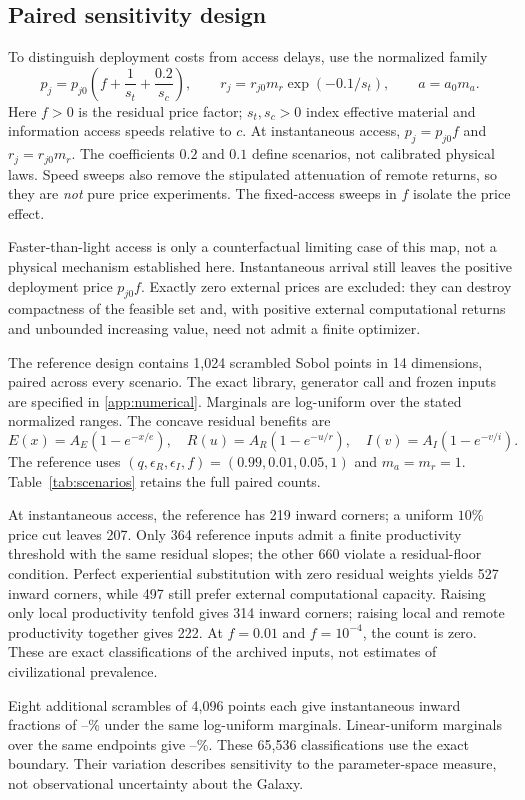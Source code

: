 \subsection{Paired sensitivity design}
To distinguish deployment costs from access delays, use the normalized
family
\begin{equation}
 p_j=p_{j0}\left(f+\frac{1}{s_t}+\frac{0.2}{s_c}\right),\qquad
 r_j=r_{j0}m_r\exp(-0.1/s_t),\qquad a=a_0m_a.
 \label{eq:speed-map}
\end{equation}
Here $f>0$ is the residual price factor; $s_t,s_c>0$ index effective
material and information access speeds relative to $c$.
At instantaneous access, $p_j=p_{j0}f$ and $r_j=r_{j0}m_r$.
The coefficients $0.2$ and $0.1$ define scenarios, not calibrated physical
laws. Speed sweeps also remove the stipulated attenuation of remote
returns, so they are \emph{not} pure price experiments. The fixed-access
sweeps in $f$ isolate the price effect.

Faster-than-light access is only a counterfactual limiting case of this
map, not a physical mechanism established here. Instantaneous arrival
still leaves the positive deployment price $p_{j0}f$. Exactly zero
external prices are excluded: they can destroy compactness of the
feasible set and, with positive external computational returns and
unbounded increasing value, need not admit a finite optimizer.

The reference design contains 1,024 scrambled Sobol points in 14
dimensions, paired across every scenario. The exact library, generator
call and frozen inputs are specified in \cref{app:numerical}. Marginals
are log-uniform over the stated normalized ranges. The concave residual
benefits are
\begin{equation}
 E(x)=A_E(1-e^{-x/e}),\quad
 R(u)=A_R(1-e^{-u/r}),\quad
 I(v)=A_I(1-e^{-v/i}).
 \label{eq:benefit-family}
\end{equation}
The reference uses $(q,\epsilon_R,\epsilon_I,f)=(0.99,0.01,0.05,1)$
and $m_a=m_r=1$. Table~\ref{tab:scenarios} retains the full paired counts.

At instantaneous access, the reference has 219 inward corners; a
uniform $10\%$ price cut leaves 207. Only 364 reference inputs admit
a finite productivity threshold with the same residual slopes; the other
660 violate a residual-floor condition. Perfect experiential substitution
with zero residual weights yields 527 inward corners, while 497 still
prefer external computational capacity. Raising only local productivity
tenfold gives 314 inward corners; raising local and remote productivity
together gives 222. At $f=0.01$ and $f=10^{-4}$, the count is zero.
These are exact classifications of the archived inputs, not estimates of
civilizational prevalence.

Eight additional scrambles of 4,096 points each give instantaneous
inward fractions of \DesignLogMin--\DesignLogMax\% under the same
log-uniform marginals. Linear-uniform marginals over the same endpoints
give \DesignLinearMin--\DesignLinearMax\%. These 65,536 classifications
use the exact boundary. Their variation describes sensitivity to the
parameter-space measure, not observational uncertainty about the Galaxy.

